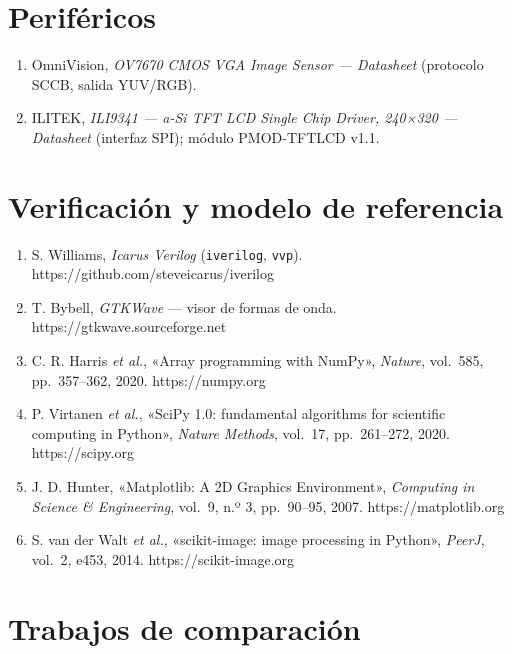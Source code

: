 \section{Periféricos}\label{perifuxe9ricos}

\begin{enumerate}
\def\labelenumi{\arabic{enumi}.}
\setcounter{enumi}{37}
\tightlist
\item
  OmniVision, \emph{OV7670 CMOS VGA Image Sensor --- Datasheet}
  (protocolo SCCB, salida YUV/RGB).
\item
  ILITEK, \emph{ILI9341 --- a-Si TFT LCD Single Chip Driver, 240×320 ---
  Datasheet} (interfaz SPI); módulo PMOD-TFTLCD v1.1.
\end{enumerate}

\section{Verificación y modelo de
referencia}\label{verificaciuxf3n-y-modelo-de-referencia}

\begin{enumerate}
\def\labelenumi{\arabic{enumi}.}
\setcounter{enumi}{39}
\tightlist
\item
  S. Williams, \emph{Icarus Verilog} (\texttt{iverilog}, \texttt{vvp}).
  https://github.com/steveicarus/iverilog
\item
  T. Bybell, \emph{GTKWave} --- visor de formas de onda.
  https://gtkwave.sourceforge.net
\item
  C. R. Harris \emph{et al.}, «Array programming with NumPy»,
  \emph{Nature}, vol.~585, pp.~357--362, 2020. https://numpy.org
\item
  P. Virtanen \emph{et al.}, «SciPy 1.0: fundamental algorithms for
  scientific computing in Python», \emph{Nature Methods}, vol.~17,
  pp.~261--272, 2020. https://scipy.org
\item
  J. D. Hunter, «Matplotlib: A 2D Graphics Environment», \emph{Computing
  in Science \& Engineering}, vol.~9, n.º 3, pp.~90--95, 2007.
  https://matplotlib.org
\item
  S. van der Walt \emph{et al.}, «scikit-image: image processing in
  Python», \emph{PeerJ}, vol.~2, e453, 2014. https://scikit-image.org
\end{enumerate}

\section{Trabajos de comparación}\label{trabajos-de-comparaciuxf3n}

